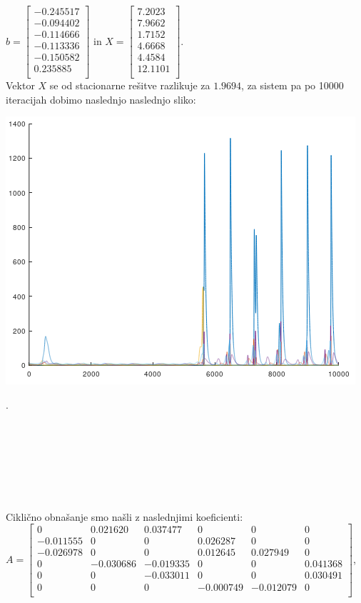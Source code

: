 \documentclass[a4paper, 12pt]{article}
\begin{document}
$ b =
\begin{bmatrix}
	-0.245517 \\
	-0.094402 \\
	-0.114666 \\
	-0.113336 \\
	-0.150582 \\
	0.235885 \\
\end{bmatrix} $ in
$ X =
\begin{bmatrix}
	7.2023 \\
	7.9662 \\
	1.7152 \\
	4.6668 \\
	4.4584 \\
	12.1101 \\
\end{bmatrix} $. \\
Vektor $ X $ se od stacionarne rešitve razlikuje za $ 1.9694 $,
za sistem pa po 10000 iteracijah dobimo naslednjo naslednjo sliko:\\
\begin{center}
	\includegraphics{caos.png}
\end{center}
.
\\
\\
\\
\\
\\
\\
\\
\\
Ciklično obnašanje smo našli z naslednjimi koeficienti:\\
$ A =
\begin{bmatrix}
	0 & 0.021620 & 0.037477 & 0 & 0 & 0 \\
	-0.011555 & 0 & 0 & 0.026287 & 0 & 0 \\
	-0.026978 & 0 & 0 & 0.012645 & 0.027949 & 0 \\
	0 & -0.030686 & -0.019335 & 0 & 0 & 0.041368 \\
	0 & 0 & -0.033011 & 0 & 0 & 0.030491 \\
	0 & 0 & 0 & -0.000749 & -0.012079 & 0 \\
\end{bmatrix} $, 
\end{document}
